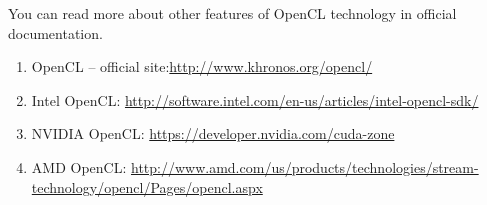 {\begin{figure}[H]
		\label{OpenCLKernelExample:image}
	\end{figure}
	\sloppy You can read more about other features of OpenCL technology %
	in official documentation.
	\begin{enumerate}
		\sloppy
		\item OpenCL – official site:\url{http://www.khronos.org/opencl/}
		\item Intel OpenCL: \url{http://software.intel.com/en-us/articles/intel-opencl-sdk/}
		\item NVIDIA OpenCL: \url{https://developer.nvidia.com/cuda-zone}
		\item AMD OpenCL: \url{http://www.amd.com/us/products/technologies/stream-technology/opencl/Pages/opencl.aspx}
	\end{enumerate}
}